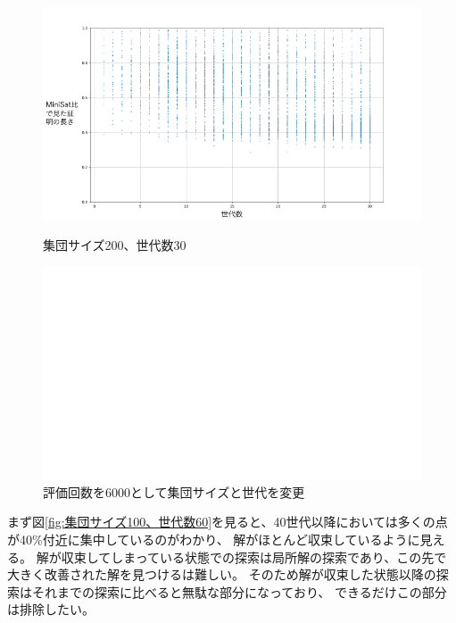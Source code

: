 \begin{figure}[h]
    \vspace{3mm}
    
    \begin{minipage}{0.43\columnwidth}
        \centering
        \includegraphics[width=1.2\columnwidth]{figures/Experiment1/4-3.png}
        \caption{集団サイズ200、世代数30}
        \label{fig:集団サイズ200、世代数30}
    \end{minipage}
    \hspace{5mm}
    \begin{minipage}{0.43\columnwidth}
        \centering
        \includegraphics[width=1.2\columnwidth]{figures/white.png}
    \end{minipage}
    \caption*{評価回数を6000として集団サイズと世代を変更}
\end{figure}

まず図\ref{fig:集団サイズ100、世代数60}を見ると、40世代以降においては多くの点が40\%付近に集中しているのがわかり、
解がほとんど収束しているように見える。
解が収束してしまっている状態での探索は局所解の探索であり、この先で大きく改善された解を見つけるは難しい。
そのため解が収束した状態以降の探索はそれまでの探索に比べると無駄な部分になっており、
できるだけこの部分は排除したい。

